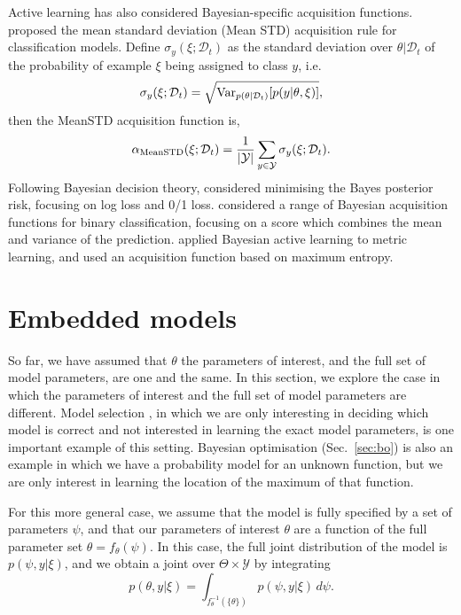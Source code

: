 \documentclass[a4paper, 10pt]{report}
\theoremstyle{plain}
\begin{document}
	Active learning has also considered Bayesian-specific acquisition functions.
	\citet{kendall2015bayesian} proposed the mean standard deviation (Mean STD) acquisition rule for classification models.
	Define $\sigma_y(\xi;\mathcal{D}_t)$ as the standard deviation over $\theta|\mathcal{D}_t$ of the probability of example $\xi$ being assigned to class $y$, i.e.~
	\begin{equation}
	\sigma_y(\xi;\mathcal{D}_t) = \sqrt{\mathrm{Var}_{p(\theta|\mathcal{D}_t)}[p(y|\theta,\xi)]},
	\end{equation}
	then the MeanSTD acquisition function is,
	\begin{equation}
	\alpha_\textup{MeanSTD}(\xi;\mathcal{D}_t) = \frac{1}{|\mathcal{Y}|}\sum_{y\in\mathcal{Y}} \sigma_y(\xi;\mathcal{D}_t).
	\end{equation}
	Following Bayesian decision theory, \citet{roy2001toward} considered minimising the Bayes posterior risk, focusing on log loss and 0/1 loss.  \citet{kapoor2007active} considered a range of Bayesian acquisition functions for binary classification, focusing on a score which combines the mean and variance of the prediction. \citet{yang2012bayesian} applied Bayesian active learning to metric learning, and used an acquisition function based on maximum entropy.
	
	
	
	
	\section{Embedded models}
	\label{sec:embedded}
	So far, we have assumed that $\theta$ the parameters of interest, and the full set of model parameters, are one and the same.
	In this section, we explore the case in which the parameters of interest and the full set of model parameters are different.
	Model selection \citep{vanlier2014optimal,drovandi2014sequential}, in which we are only interesting in deciding which model is correct and not interested in learning the exact model parameters, is one important example of this setting.
	Bayesian optimisation (Sec.~\ref{sec:bo}) is also an example in which we have a probability model for an unknown function, but we are only interest in learning the location of the maximum of that function.
	
	For this more general case, we assume that the model is fully specified by a set of parameters $\psi$, and that our parameters of interest $\theta$ are a function of the full parameter set $\theta=f_\theta(\psi)$. In this case, the full joint distribution of the model is $p(\psi,y|\xi)$, and we obtain a joint over $\Theta \times \mathcal{Y}$ by integrating 
	\begin{equation}
	p(\theta,y|\xi) = \int_{f_\theta^{-1}(\{\theta\})} p(\psi,y|\xi)\,d\psi.
	\end{equation}
	
\end{document}
